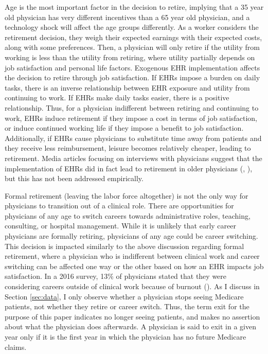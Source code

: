 \documentclass[12pt]{article}
\begin{document}
Age is the most important factor in the decision to retire, implying that a 35 year old physician has very different incentives than a 65 year old physician, and a technology shock will affect the age groups differently. As a worker considers the retirement decision, they weigh their expected earnings with their expected costs, along with some preferences. Then, a physician will only retire if the utility from working is less than the utility from retiring, where utility partially depends on job satisfaction and personal life factors. Exogenous EHR implementation affects the decision to retire through job satisfaction. If EHRs impose a burden on daily tasks, there is an inverse relationship between EHR exposure and utility from continuing to work. If EHRs make daily tasks easier, there is a positive relationship. Thus, for a physician indifferent between retiring and continuing to work, EHRs induce retirement if they impose a cost in terms of job satisfaction, or induce continued working life if they impose a benefit to job satisfaction. Additionally, if EHRs cause physicians to substitute time away from patients and they receive less reimbursement, leisure becomes relatively cheaper, leading to retirement. Media articles focusing on interviews with physicians suggest that the implementation of EHRs did in fact lead to retirement in older physicians (\cite{ringel_2019}, \cite{loria_2020}), but this has not been addressed empirically. 

Formal retirement (leaving the labor force altogether) is not the only way for physicians to transition out of a clinical role. There are opportunities for physicians of any age to switch careers towards administrative roles, teaching, consulting, or hospital management. While it is unlikely that early career physicians are formally retiring, physicians of any age could be career switching. This decision is impacted similarly to the above discussion regarding formal retirement, where a physician who is indifferent between clinical work and career switching can be affected one way or the other based on how an EHR impacts job satisfaction. In a 2016 survey, 13\% of physicians stated that they were considering careers outside of clinical work because of burnout (\cite{physicians2016physicians}). As I discuss in Section \ref{sec:data}, I only observe whether a physician stops seeing Medicare patients, not whether they retire or career switch. Thus, the term exit for the purpose of this paper indicates no longer seeing patients, and makes no assertion about what the physician does afterwards. A physician is said to exit in a given year only if it is the first year in which the physician has no future Medicare claims.
\end{document}
